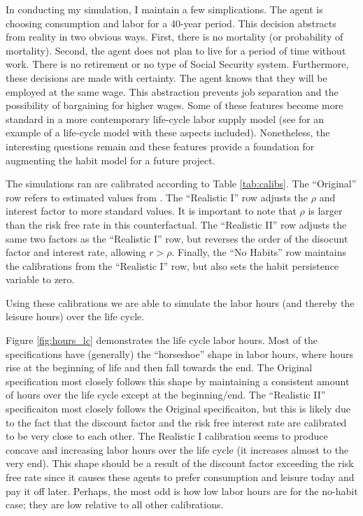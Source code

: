 \documentclass[ProjectMMD]{subfiles}
\begin{document}
In conducting my simulation, I maintain a few simplications. The agent is choosing consumption and labor for a 40-year period. This decision abstracts from reality in two obvious ways. First, there is no mortality (or probability of mortality). Second, the agent does not plan to live for a period of time without work. There is no retirement or no type of Social Security system. Furthermore, these decisions are made with certainty. The agent knows that they will be employed at the same wage. This abstraction prevents job separation and the possibility of bargaining for higher wages. Some of these features become more standard in a more contemporary life-cycle labor supply model (see \cite{keane2016labour} for an example of a life-cycle model with these aspects included). Nonetheless, the interesting questions remain and these features provide a foundation for augmenting the habit model for a future project. 

The simulations ran are calibrated according to Table \ref{tab:calibs}. The ``Original'' row refers to estimated values from \cite{bover1991relaxing}. The ``Realistic I'' row adjusts the $\rho$ and interest factor to more standard values. It is important to note that $\rho$ is larger than the risk free rate in this counterfactual.  The ``Realistic II'' row adjusts the same two factors as the ``Realistic I'' row, but reverses the order of the disocunt factor and interest rate, allowing $r > \rho$. Finally, the ``No Habits'' row maintains the calibrations from the ``Realistic I'' row, but also sets the habit persistence variable to zero.

Using these calibrations we are able to simulate the labor hours (and thereby the leisure hours) over the life cycle.
\renewcommand{\figName}{hours_lc}
\renewcommand{\figFile}{\figName}
\hypertarget{\figFile}{}


Figure \ref{fig:hours_lc} demonstrates the life cycle labor hours. Most of the specifications have (generally) the ``horseshoe'' shape in labor hours, where hours rise at the beginning of life and then fall towards the end. The Original specification most closely follows this shape by maintaining a consistent amount of hours over the life cycle except at the beginning/end. The ``Realistic II'' specificaiton most closely follows the Original specificaiton, but this is likely due to the fact that the discount factor and the risk free interest rate are calibrated to be very close to each other. The Realistic I calibration seems to produce concave and increasing labor hours over the life cycle (it increases almost to the very end). This shape should be a result of the discount factor exceeding the risk free rate since it causes these agents to prefer consumption and leisure today and pay it off later. Perhaps, the most odd is how low labor hours are for the no-habit case; they are low relative to all other calibrations. 
\end{document}
